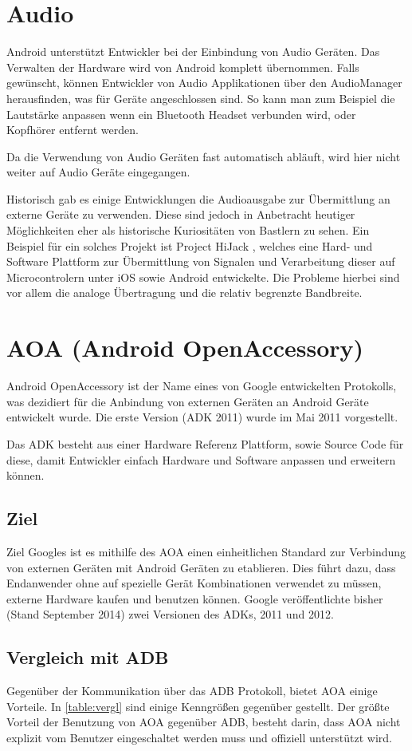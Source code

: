 \documentclass[12pt,journal,compsoc]{IEEEtran}
\begin{document}
\section{Audio}
Android unterstützt Entwickler bei der Einbindung von Audio Geräten. Das Verwalten der Hardware wird von Android komplett übernommen.
Falls gewünscht, können Entwickler von Audio Applikationen über den AudioManager herausfinden, was für Geräte angeschlossen sind. So kann man zum Beispiel die Lautstärke anpassen wenn ein Bluetooth Headset verbunden wird, oder Kopfhörer entfernt werden.

Da die Verwendung von Audio Geräten fast automatisch abläuft, wird hier nicht weiter auf Audio Geräte eingegangen.

Historisch gab es einige Entwicklungen die Audioausgabe zur Übermittlung an externe Geräte zu verwenden. Diese sind jedoch in Anbetracht heutiger Möglichkeiten eher als historische Kuriositäten von Bastlern zu sehen.
Ein Beispiel für ein solches Projekt ist Project HiJack \cite{hijack} , welches eine Hard- und Software Plattform zur Übermittlung von Signalen und Verarbeitung dieser auf Microcontrolern unter iOS sowie Android entwickelte.
Die Probleme hierbei sind vor allem die analoge Übertragung und die relativ begrenzte Bandbreite.


\section{AOA (Android OpenAccessory)}
Android OpenAccessory ist der Name eines von Google entwickelten Protokolls, was 
dezidiert für die Anbindung von externen Geräten an Android Geräte entwickelt wurde.
Die erste Version (ADK 2011) wurde im Mai 2011 vorgestellt.

Das ADK besteht aus einer Hardware Referenz Plattform, sowie Source Code für diese, damit 
Entwickler einfach Hardware und Software anpassen und erweitern können.
\cite{developaoa}
\subsection{Ziel}
Ziel Googles ist es mithilfe des AOA einen einheitlichen Standard zur Verbindung von externen Geräten mit Android Geräten zu etablieren.
Dies führt dazu, dass Endanwender ohne auf spezielle Gerät Kombinationen verwendet zu müssen, externe Hardware kaufen und benutzen können.
Google veröffentlichte bisher (Stand September 2014) zwei Versionen des ADKs, 2011 und 2012. 

\subsection{Vergleich mit ADB}
Gegenüber der Kommunikation über das ADB Protokoll, bietet AOA einige Vorteile. In \ref{table:vergl} sind einige Kenngrößen gegenüber gestellt. Der größte Vorteil der Benutzung von AOA gegenüber ADB, besteht darin, dass AOA nicht explizit vom Benutzer eingeschaltet werden muss und offiziell unterstützt wird.
\end{document}
